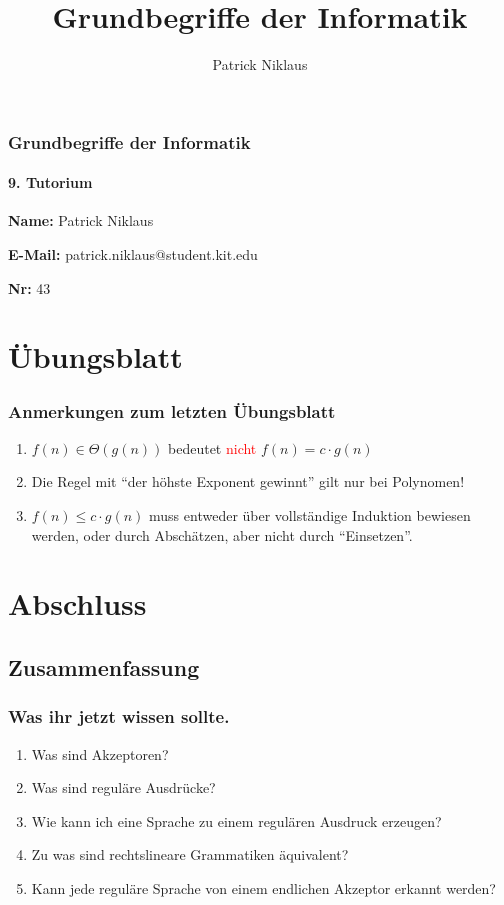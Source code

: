 \documentclass{beamer}
\title{Grundbegriffe der Informatik}
\author{Patrick Niklaus}
\newcommand{\warn}[1]{\textcolor{red}{#1}}
\begin{document}
\begin{frame}
  \frametitle{Grundbegriffe der Informatik}
  \framesubtitle{9. Tutorium}
  \begin{description}
    \item \textbf{Name:} Patrick Niklaus
    \item \textbf{E-Mail:} patrick.niklaus@student.kit.edu
    \item \textbf{Nr:} 43
  \end{description}
\end{frame}

\section{Übungsblatt}
\begin{frame}
  \frametitle{Anmerkungen zum letzten Übungsblatt}
  \begin{enumerate}
    \item $f(n) \in \Theta(g(n))$ bedeutet \warn{nicht} $f(n) = c \cdot g(n)$
    \item Die Regel mit "`der höhste Exponent gewinnt"' gilt nur bei Polynomen!
    \item $f(n) \leq c \cdot g(n)$ muss entweder über vollständige Induktion bewiesen werden, oder durch Abschätzen, aber nicht durch "`Einsetzen"'.
  \end{enumerate}
\end{frame}




% 

\section{Abschluss}
\subsection{Zusammenfassung}
\begin{frame}
  \frametitle{Was ihr jetzt wissen sollte.}
  \begin{enumerate}
    \item Was sind Akzeptoren?
    \item Was sind reguläre Ausdrücke?
    \item Wie kann ich eine Sprache zu einem regulären Ausdruck erzeugen?
    \item Zu was sind rechtslineare Grammatiken äquivalent?
    \item Kann jede reguläre Sprache von einem endlichen Akzeptor erkannt werden?
  \end{enumerate}
\end{frame}
\end{document}
